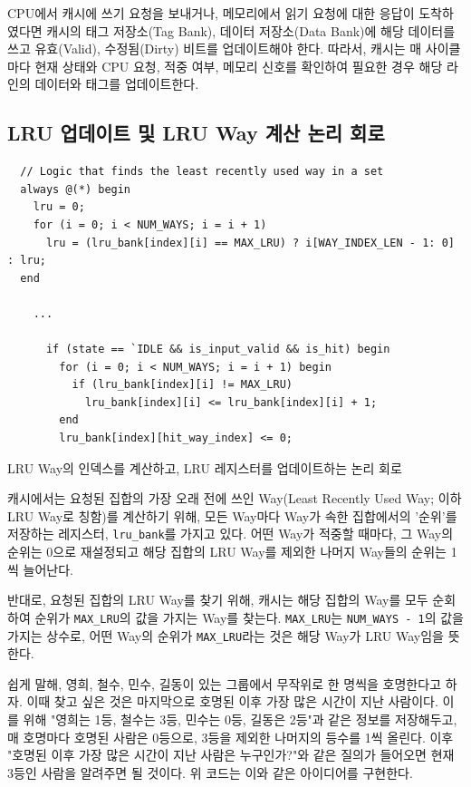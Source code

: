 \documentclass[openright, a4paper]{article}
\newcommand{\code}[1]{\texttt{#1}}
\newenvironment{longlisting}{\captionsetup{type=listing}}{}
\begin{document}
CPU에서 캐시에 쓰기 요청을 보내거나, 메모리에서 읽기 요청에 대한 응답이
도착하였다면 캐시의 태그 저장소(Tag Bank), 데이터 저장소(Data Bank)에 해당 
데이터를 쓰고 유효(Valid), 수정됨(Dirty) 비트를 업데이트해야 한다. 따라서, 캐시는
매 사이클마다 현재 상태와 CPU 요청, 적중 여부, 메모리 신호를 확인하여 필요한 경우
해당 라인의 데이터와 태그를 업데이트한다.

\subsection{LRU 업데이트 및 LRU Way 계산 논리 회로}

\hfill

\begin{longlisting}
    \begin{verbatim}
  // Logic that finds the least recently used way in a set 
  always @(*) begin
    lru = 0;
    for (i = 0; i < NUM_WAYS; i = i + 1)
      lru = (lru_bank[index][i] == MAX_LRU) ? i[WAY_INDEX_LEN - 1: 0] : lru;
  end

    ...

      if (state == `IDLE && is_input_valid && is_hit) begin
        for (i = 0; i < NUM_WAYS; i = i + 1) begin
          if (lru_bank[index][i] != MAX_LRU)
            lru_bank[index][i] <= lru_bank[index][i] + 1;
        end
        lru_bank[index][hit_way_index] <= 0;
    \end{verbatim}
    \caption{LRU Way의 인덱스를 계산하고, LRU 레지스터를 업데이트하는 논리 회로}
\end{longlisting}

\hfill

캐시에서는 요청된 집합의 가장 오래 전에 쓰인 Way(Least Recently Used Way; 이하 
LRU Way로 칭함)를 계산하기 위해, 모든 Way마다 Way가 속한 집합에서의 '순위'를 
저장하는 레지스터, \code{lru_bank}를 가지고 있다. 어떤 Way가 적중할 때마다, 그
Way의 순위는 0으로 재설정되고 해당 집합의 LRU Way를 제외한 나머지 Way들의 순위는 
1씩 늘어난다.

반대로, 요청된 집합의 LRU Way를 찾기 위해, 캐시는 해당 집합의 Way를 모두 순회하여
순위가 \code{MAX_LRU}의 값을 가지는 Way를 찾는다. \code{MAX_LRU}는 
\code{NUM_WAYS - 1}의 값을 가지는 상수로, 어떤 Way의 순위가 \code{MAX_LRU}라는
것은 해당 Way가 LRU Way임을 뜻한다.

쉽게 말해, 영희, 철수, 민수, 길동이 있는 그룹에서 무작위로 한 명씩을 호명한다고
하자. 이때 찾고 싶은 것은 마지막으로 호명된 이후 가장 많은 시간이 지난 사람이다. 
이를 위해 "영희는 1등, 철수는 3등, 민수는 0등, 길동은 2등"과 같은 정보를 
저장해두고, 매 호명마다 호명된 사람은 0등으로, 3등을 제외한 나머지의 등수를 1씩 
올린다. 이후 "호명된 이후 가장 많은 시간이 지난 사람은 누구인가?"와 같은 질의가 
들어오면 현재 3등인 사람을 알려주면 될 것이다. 위 코드는 이와 같은 아이디어를 
구현한다.
\end{document}
